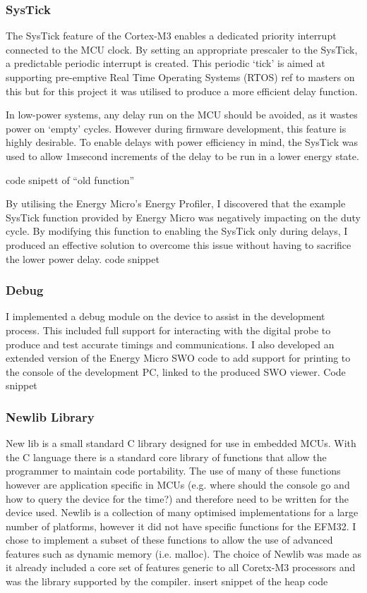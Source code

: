 \subsubsection{SysTick}
The SysTick feature of the Cortex-M3 enables a dedicated priority interrupt connected to the MCU
clock. By setting an appropriate prescaler to the SysTick, a predictable periodic interrupt is created.
This periodic ‘tick’ is aimed at supporting pre-emptive Real Time Operating Systems (RTOS) {ref to
masters on this} but for this project it was utilised to produce a more efficient delay function.


In low-power systems, any delay run on the MCU should be avoided, as it wastes power on ‘empty’
cycles. However during firmware development, this feature is highly desirable. To enable delays with
power efficiency in mind, the SysTick was used to allow 1msecond increments of the delay to be run
in a lower energy state.


{code snipett of “old function”}


By utilising the Energy Micro’s Energy Profiler, I discovered that the example SysTick function
provided by Energy Micro was negatively impacting on the duty cycle. By modifying this function to
enabling the SysTick only during delays, I produced an effective solution to overcome this issue
without having to sacrifice the lower power delay.
{code snippet }

\subsubsection{Debug}
I implemented a debug module on the device to assist in the development process. This included full
support for interacting with the digital probe to produce and test accurate timings and
communications. I also developed an extended version of the Energy Micro SWO code to add
support for printing to the console of the development PC, linked to the produced SWO viewer.
Code snippet

\subsubsection{Newlib Library}
New lib is a small standard C library designed for use in embedded MCUs. With the C language there
is a standard core library of functions that allow the programmer to maintain code portability. The
use of many of these functions however are application specific in MCUs (e.g. where should the
console go and how to query the device for the time?) and therefore need to be written for the
device used. Newlib is a collection of many optimised implementations for a large number of
platforms, however it did not have specific functions for the EFM32. I chose to implement a subset
of these functions to allow the use of advanced features such as dynamic memory (i.e. malloc). The
choice of Newlib was made as it already included a core set of features generic to all Coretx-M3
processors and was the library supported by the compiler.
{insert snippet of the heap code}


